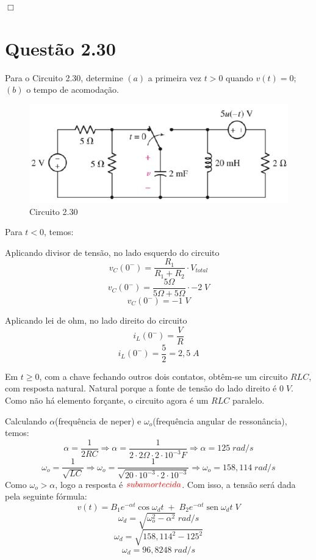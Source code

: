 \documentclass[
	12pt,				%
	oneside,			%
	a4paper,			%
	english,			%
	french,				%
	spanish,			%
	brazil				%
	]{abntex2}
\DeclareMathOperator{\sen}{sen}
\begin{document}
\begin{flushright}
    $\Box$
\end{flushright}
\newpage


\section*{Questão 2.30}
Para o Circuito 2.30, determine $(a)$ a primeira vez $t > 0$ quando $v(t) = 0$; $(b)$ o tempo de acomodação. 
\begin{figure}[htb]
	\centering
	\includegraphics[scale=0.7]{2-30.PNG}
	\caption{Circuito 2.30}
\end{figure}

Para $t<0$, temos:

Aplicando divisor de tensão, no lado esquerdo do circuito
$$v_C(0^-)=\dfrac{R_1}{R_1+R_2}\cdot V_{total} $$
$$v_C(0^-)=\dfrac{5\Omega}{5\Omega+5\Omega}\cdot-2\;V $$
$$v_C(0^-)=-1\;V$$

Aplicando lei de ohm, no lado direito do circuito
$$i_L(0^-)=\dfrac{V}{R}$$
$$i_L(0^-)=\dfrac{5}{2} = 2,5\;A$$

Em $t\geq0$, com a chave fechando outros dois contatos, obtêm-se um circuito $RLC$, com resposta natural. Natural porque a fonte de tensão do lado direito é $0\;V$. Como não há elemento forçante, o circuito agora é um $RLC$ paralelo.

Calculando $\alpha$(frequência de neper) e $\omega_o$(frequência angular de ressonância), temos:
$$\alpha=\dfrac{1}{2 R C} \Longrightarrow \alpha=\dfrac{1}{2\cdot 2\Omega \cdot 2\cdot10^{-3}F} \Longrightarrow \alpha=125\;rad/s$$
$$\omega_o=\dfrac{1}{\sqrt{L C}} \Longrightarrow \omega_o=\dfrac{1}{\sqrt{20\cdot10^{-3} \cdot 2\cdot10^{-3}}} \Longrightarrow \omega_o=158,114\;rad/s$$
\newpage
Como $\omega_o>\alpha$, logo a resposta é $\textcolor{red}{subamortecida}$. Com isso, a tensão será dada pela seguinte fórmula:
$$v(t)=B_1 e^{-\alpha t} \cos{\omega_d t}\;+\;B_2 e^{-\alpha t} \sen{\omega_d t}\;V$$
$$\omega_d=\sqrt{\omega_o^2-\alpha^2}\;rad/s$$
$$\omega_d=\sqrt{158,114^2-125^2}$$
$$\omega_d=96,8248\;rad/s$$
\end{document}
